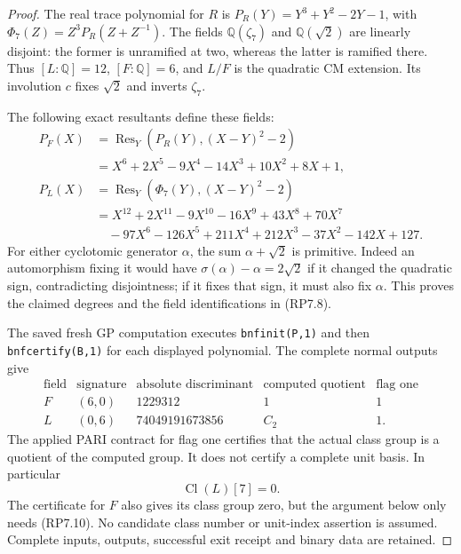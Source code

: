 \begin{proof}
The real trace polynomial for $R$ is
$P_R(Y)=Y^3+Y^2-2Y-1$, with
$\Phi_7(Z)=Z^3P_R(Z+Z^{-1})$.
The fields $\mathbb Q(\zeta_7)$ and $\mathbb Q(\sqrt2)$ are
linearly disjoint: the former is unramified at two, whereas
the latter is ramified there. Thus $[L:\mathbb Q]=12$,
$[F:\mathbb Q]=6$, and $L/F$ is the quadratic CM extension.
Its involution $c$ fixes $\sqrt2$ and inverts $\zeta_7$.

The following exact resultants define these fields:
\[
 \begin{aligned}
 P_F(X)&=\operatorname{Res}_Y(P_R(Y),(X-Y)^2-2)\\
 &=X^6+2X^5-9X^4-14X^3+10X^2+8X+1,\\
 P_L(X)&=\operatorname{Res}_Y(\Phi_7(Y),(X-Y)^2-2)\\
 &=X^{12}+2X^{11}-9X^{10}-16X^9+43X^8+70X^7\\
 &\quad-97X^6-126X^5+211X^4+212X^3-37X^2-142X+127.
 \end{aligned}\tag{RP7.8}
\]
For either cyclotomic generator $\alpha$, the sum
$\alpha+\sqrt2$ is primitive. Indeed an automorphism fixing it
would have $\sigma(\alpha)-\alpha=2\sqrt2$ if it changed the
quadratic sign, contradicting disjointness; if it fixes that
sign, it must also fix $\alpha$. This proves the claimed
degrees and the field identifications in (RP7.8).

The saved fresh GP computation executes \texttt{bnfinit(P,1)}
and then \texttt{bnfcertify(B,1)} for each displayed polynomial.
The complete normal outputs give
\[
 \begin{array}{c|c|c|c|c}
 \text{field}&\text{signature}&\text{absolute discriminant}
                         &\text{computed quotient}&\text{flag one}\\\hline
 F&(6,0)&1229312&1&1\\
 L&(0,6)&74049191673856&C_2&1.
 \end{array}\tag{RP7.9}
\]
The applied PARI contract for flag one certifies that the
actual class group is a quotient of the computed group.
It does not certify a complete unit basis. In particular
\[
                    \operatorname{Cl}(L)[7]=0.
 \tag{RP7.10}
\]
The certificate for $F$ also gives its class group zero, but
the argument below only needs (RP7.10). No candidate class
number or unit-index assertion is assumed. Complete inputs,
outputs, successful exit receipt and binary data are retained.


\end{proof}
